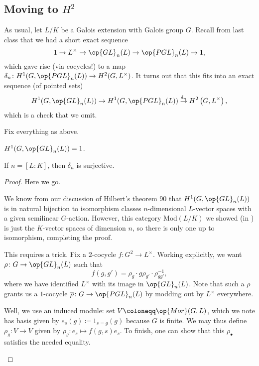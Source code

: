 \documentclass[../notes.tex]{subfiles}
\begin{document}
\subsection{Moving to \texorpdfstring{$H^2$}{ H2}}
As usual, let $L/K$ be a Galois extension with Galois group $G$. Recall from last class that we had a short exact sequence
\[1\to L^\times\to\op{GL}_n(L)\to\op{PGL}_n(L)\to1,\]
which gave rise (via cocycles!) to a map $\delta_n\colon H^1(G,\op{PGL}_n(L))\to H^2(G,L^\times)$. It turns out that this fits into an exact sequence (of pointed sets)
\[H^1(G,\op{GL}_n(L))\to H^1(G,\op{PGL}_n(L))\stackrel{\delta_n}\to H^2\left(G,L^\times\right),\]
which is a check that we omit.
\begin{lemma} \label{lem:delta-n-is-iso}
	Fix everything as above.
	\begin{listalph}
		\item $H^1(G,\op{GL}_n(L))=1$.
		\item If $n=[L:K]$, then $\delta_n$ is surjective.
	\end{listalph}
\end{lemma}
\begin{proof}
	Here we go.
	\begin{listalph}
		\item We know from our discussion of Hilbert's theorem 90 that $H^1(G,\op{GL}_n(L))$ is in natural bijection to isomorphism classes $n$-dimensional $L$-vector spaces with a given semilinear $G$-action. However, this category $\mathrm{Mod}(L/K)$ we showed (in ) is just the $K$-vector spaces of dimension $n$, so there is only one up to isomorphism, completing the proof.
		\item This requires a trick. Fix a $2$-cocycle $f\colon G^2\to L^\times$. Working explicitly, we want $\rho\colon G\to\op{GL}_n(L)$ such that
		\[f(g,g')=\rho_g\cdot g\rho_{g'}\cdot\rho_{gg'}^{-1},\]
		where we have identified $L^\times$ with its image in $\op{GL}_n(L)$. Note that such a $\rho$ grants us a $1$-cocycle $\overline\rho\colon G\to\op{PGL}_n(L)$ by modding out by $L^\times$ everywhere.
		
		Well, we use an induced module: set $V\coloneqq\op{Mor}(G,L)$, which we note has basis given by $e_s(g)\coloneqq1_{s=g}(g)$ because $G$ is finite. We may thus define $\rho_g\colon V\to V$ given by $\rho_g\colon e_s\mapsto f(g,s)e_s$. To finish, one can show that this $\rho_\bullet$ satisfies the needed equality.
		\qedhere
	\end{listalph}
\end{proof}
\end{document}

